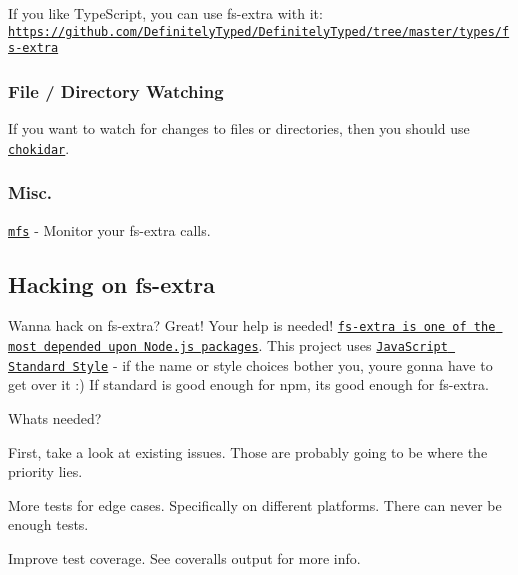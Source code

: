If you like Type\+Script, you can use {\ttfamily fs-\/extra} with it\+: \href{https://github.com/DefinitelyTyped/DefinitelyTyped/tree/master/types/fs-extra}{\tt https\+://github.\+com/\+Definitely\+Typed/\+Definitely\+Typed/tree/master/types/fs-\/extra}

\subsubsection*{File / Directory Watching}

If you want to watch for changes to files or directories, then you should use \href{https://github.com/paulmillr/chokidar}{\tt chokidar}.

\subsubsection*{Misc.}


\begin{DoxyItemize}
\item \href{https://github.com/cadorn/mfs}{\tt mfs} -\/ Monitor your fs-\/extra calls.
\end{DoxyItemize}

\subsection*{Hacking on fs-\/extra }

Wanna hack on {\ttfamily fs-\/extra}? Great! Your help is needed! \href{http://nodei.co/npm/fs-extra.png?downloads=true&downloadRank=true&stars=true}{\tt fs-\/extra is one of the most depended upon Node.\+js packages}. This project uses \href{https://github.com/feross/standard}{\tt Java\+Script Standard Style} -\/ if the name or style choices bother you, you\textquotesingle{}re gonna have to get over it \+:) If {\ttfamily standard} is good enough for {\ttfamily npm}, it\textquotesingle{}s good enough for {\ttfamily fs-\/extra}.

\href{https://github.com/feross/standard}{\tt }

What\textquotesingle{}s needed?
\begin{DoxyItemize}
\item First, take a look at existing issues. Those are probably going to be where the priority lies.
\item More tests for edge cases. Specifically on different platforms. There can never be enough tests.
\item Improve test coverage. See coveralls output for more info.
\end{DoxyItemize}

